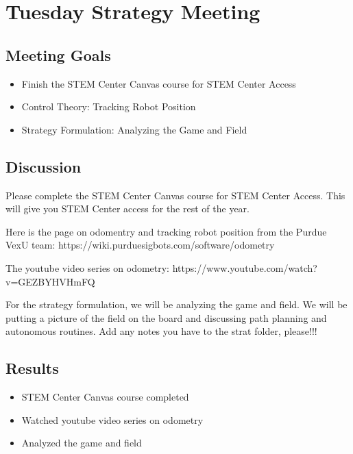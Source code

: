 \section{Tuesday Strategy Meeting}

\subsection{Meeting Goals}
\begin{itemize}
    \item Finish the STEM Center Canvas course for STEM Center Access
    \item Control Theory: Tracking Robot Position
    \item Strategy Formulation: Analyzing the Game and Field
\end{itemize}

\subsection{Discussion}


Please complete the STEM Center Canvas course for STEM Center Access. This will give you STEM Center access for the rest of the year.

Here is the page on odomentry and tracking robot position from the Purdue VexU team: https://wiki.purduesigbots.com/software/odometry

The youtube video series on odometry: https://www.youtube.com/watch?v=GEZBYHVHmFQ

For the strategy formulation, we will be analyzing the game and field. We will be putting a picture of the field on the board and discussing path planning and autonomous routines. Add any notes you have to the strat folder, please!!!

\subsection{Results}
\begin{itemize}
    \item STEM Center Canvas course completed
    \item Watched youtube video series on odometry
    \item Analyzed the game and field
\end{itemize}
